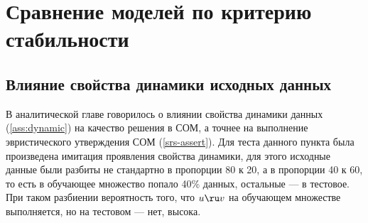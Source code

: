 
\section{Сравнение моделей по критерию стабильности}
\subsection{Влияние свойства динамики исходных данных}

В аналитической главе говорилось о влиянии свойства динамики
данных (\ref{ass:dynamic}) на качество решения в СОМ, а точнее на выполнение
эвристического утверждения СОМ (\ref{srs-assert}). Для теста данного пункта
была произведена имитация проявления свойства динамики, для этого
исходные данные были разбиты не стандартно в пропорции 80 к 20, а
в пропорции 40 к 60, то есть в обучающее множество попало 40\%
данных, остальные --- в тестовое. При таком разбиении вероятность
того, что $u \ru v$ на обучающем множестве выполняется, но на тестовом --- нет,
высока.


